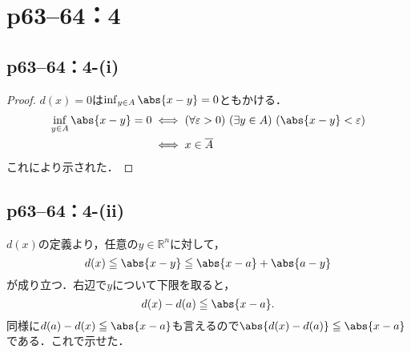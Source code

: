 \documentclass[a4paper,10pt,fleqn]{ltjsarticle}
\begin{document}
\section*{p63--64：4}


\subsection*{p63--64：4-(i)}

\begin{tleftbar}
    \begin{proof}
        $d(x)=0$は$\inf_{y \in A} \abs{x-y} =0$ともかける．
        \begin{align*}
            \inf_{y \in A} \abs{x-y} =0 & \iff (\forall \varepsilon>0) \ (\exists y \in A)\ ( \abs{x-y}<\varepsilon ) \\
                                        & \iff x \in \overline{A}
        \end{align*}
        これにより示された．
    \end{proof}
\end{tleftbar}


\subsection*{p63--64：4-(ii)}


\begin{leftbar}
    $d(x)$の定義より，任意の$y \in \mathbb{R} ^n$に対して，
    \[
        d(x) \leq \abs{x-y} \leq \abs{x-a} + \abs{a-y}
    \]
    が成り立つ．右辺で$y$について下限を取ると，
    \[
        d(x) - d(a) \leq \abs{x-a}.
    \]
    同様に$d(a) - d(x) \leq \abs{x-a}$も言えるので$\abs{d(x) - d(a)} \leq \abs{x-a}$である．これで示せた．
\end{leftbar}

\newpage
\end{document}
